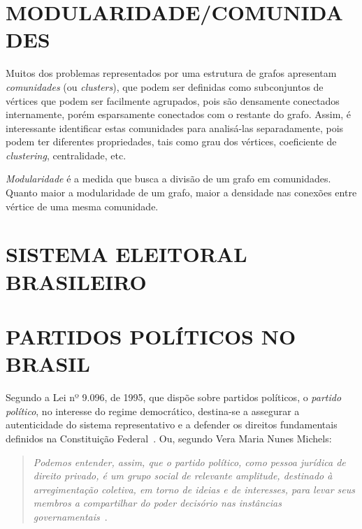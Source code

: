 \section{\texorpdfstring{\MakeUppercase{Modularidade/comunidades}}{}}
\label{conceitos__modularidade}

Muitos dos problemas representados por uma estrutura de grafos apresentam \emph{comunidades} (ou \emph{clusters}), que podem ser definidas como subconjuntos de vértices que podem ser facilmente agrupados, pois são densamente conectados internamente, porém esparsamente conectados com o restante do grafo. Assim, é interessante identificar estas comunidades para analisá-las separadamente, pois podem ter diferentes propriedades, tais como grau dos vértices, coeficiente de \emph{clustering}, centralidade, etc.

\emph{Modularidade} é a medida que busca a divisão de um grafo em comunidades. Quanto maior a modularidade de um grafo, maior a densidade nas conexões entre vértice de uma mesma comunidade.

\section{\texorpdfstring{\MakeUppercase{Sistema Eleitoral Brasileiro}}{}}


\section{\texorpdfstring{\MakeUppercase{Partidos Políticos no Brasil}}{}}
\label{conceitos__partidos-brasil}

Segundo a  Lei nº 9.096, de 1995, que dispõe sobre partidos políticos, o \emph{partido político}, no interesse do regime democrático, destina-se a assegurar a autenticidade do sistema representativo e a defender os direitos fundamentais definidos na Constituição Federal~\cite{brasil1996lei9096}. Ou, segundo Vera Maria Nunes Michels:

\begin{quotation}
    \emph{Podemos entender, assim, que o partido político, como pessoa jurídica de direito privado, é um grupo social de relevante amplitude, destinado à arregimentação coletiva, em torno de ideias e de interesses, para levar seus membros a compartilhar do poder decisório nas instâncias governamentais}~\cite{michels2006direito}.
\end{quotation}

